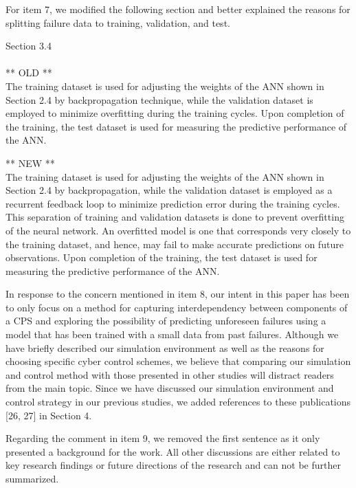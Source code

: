 \documentclass{article}
\newenvironment{response}{
  \doublespacing
  \setlength\parindent{0.05\linewidth}
  \ttfamily
}{}
\newenvironment{textblock}[1]
{\begin{tcolorbox}[breakable,enhanced]{#1 \\ \\}}
{\end{tcolorbox}}
\begin{document}
\begin{response}
For item 7, we modified the following section and better explained the reasons for splitting failure data to training, validation, and test.

\begin{textblock}{Section 3.4}
** OLD **\\
The training dataset is used for adjusting the weights of the ANN shown in Section 2.4 by backpropagation technique, while the validation dataset is employed to minimize overfitting during the training cycles. Upon completion of the training, the test dataset is used for measuring the predictive performance of the ANN.

\vspace{1em}
** NEW **\\
The training dataset is used for adjusting the weights of the ANN shown in Section 2.4 by backpropagation, while the validation dataset is employed as a recurrent feedback loop to minimize prediction error during the training cycles. This separation of training and validation datasets is done to prevent overfitting of the neural network. An overfitted model is one that corresponds very closely to the training dataset, and hence, may fail to make accurate predictions on future observations. Upon completion of the training, the test dataset is used for measuring the predictive performance of the ANN.
\end{textblock}

In response to the concern mentioned in item 8, our intent in this paper has been to only focus on a method for capturing interdependency between components of a CPS and exploring the possibility of predicting unforeseen failures using a model that has been trained with a small data from past failures. Although we have briefly described our simulation environment as well as the reasons for choosing specific cyber control schemes, we believe that comparing our simulation and control method with those presented in other studies will distract readers from the main topic. Since we have discussed our simulation environment and control strategy in our previous studies, we added references to these publications [26, 27] in Section 4.

Regarding the comment in item 9, we removed the first sentence as it only presented a background for the work. All other discussions are either related to key research findings or future directions of the research and can not be further summarized.

\end{response}
\end{document}
